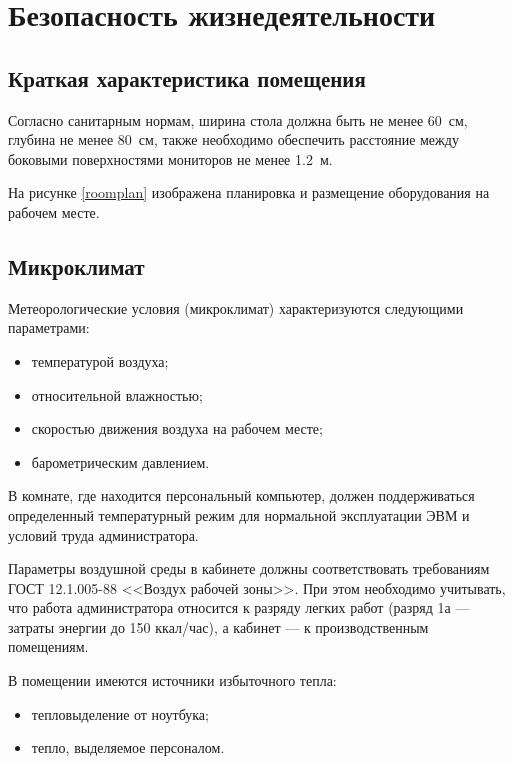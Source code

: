 \section{Безопасность жизнедеятельности}

\subsection{Краткая характеристика помещения}

Согласно санитарным нормам, ширина стола должна быть не менее 60~см, глубина не менее 80~см, также необходимо обеспечить расстояние между боковыми поверхностями мониторов не менее 1.2~м.

На рисунке \ref{roomplan} изображена планировка и размещение оборудования на рабочем месте.

\subsection{Микроклимат}

Метеорологические условия (микроклимат) характеризуются следующими параметрами:
\begin{itemize}
  \item температурой воздуха;
  \item относительной влажностью;
  \item скоростью движения воздуха на рабочем месте;
  \item барометрическим давлением.
\end{itemize}

В комнате, где находится персональный компьютер, должен поддерживаться определенный температурный режим для нормальной эксплуатации ЭВМ и условий труда администратора.

Параметры воздушной среды в кабинете должны соответствовать требованиям ГОСТ 12.1.005-88 <<Воздух рабочей зоны>>.
При этом необходимо учитывать, что работа администратора относится к разряду легких работ (разряд 1а --- затраты энергии до 150 ккал/час), а кабинет --- к производственным помещениям.

В помещении имеются источники избыточного тепла:
\begin{itemize}
  \item тепловыделение от ноутбука;
  \item тепло, выделяемое персоналом.
\end{itemize}

